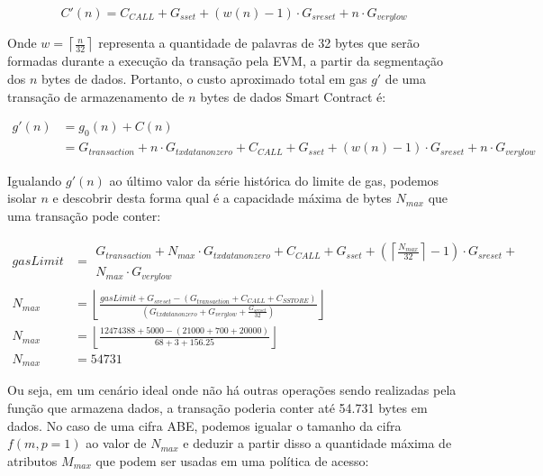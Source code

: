 \documentclass[a4paper,11pt]{article}
\begin{document}
\[ C'(n) = C_{CALL} + G_{sset} +  ( w(n) - 1 ) \cdot G_{sreset} + n \cdot G_{verylow} \]

Onde $w = \left\lceil \frac{n}{32} \right\rceil $ representa a quantidade de palavras de 32 bytes que serão formadas durante a execução da transação pela EVM, a partir da segmentação dos $n$ bytes de dados.
Portanto, o custo aproximado total em gas $g'$ de uma transação de armazenamento de $n$ bytes de dados Smart Contract é:

\begin{equation}
  \begin{aligned}
    g'(n) & = g_{0}(n) + C(n)\\
      & = G_{transaction} + n \cdot G_{txdatanonzero} + C_{CALL} + G_{sset} +  ( w(n) - 1 ) \cdot G_{sreset} + n \cdot G_{verylow}
  \end{aligned}
\end{equation}

Igualando $g'(n)$ ao último valor da série histórica do limite de gas, podemos isolar $n$ e descobrir desta forma qual é a capacidade máxima de bytes $N_{max}$ que uma transação pode conter:

\begin{equation}
  \begin{aligned}
    gasLimit & =\begin{aligned}
                    G_{transaction} + N_{max} \cdot G_{txdatanonzero} + C_{CALL} + G_{sset} + ( \left\lceil \frac{N_{max}}{32} \right\rceil - 1 ) \cdot G_{sreset} + \\ N_{max} \cdot G_{verylow}
                \end{aligned} \\
     N_{max} & = \left\lfloor \frac{gasLimit + G_{sreset} - (G_{transaction} + C_{CALL} + C_{SSTORE})}{(G_{txdatanonzero} + G_{verylow} + \frac{G_{sreset}}{32})} \right\rfloor \\
     N_{max} & = \left\lfloor \frac{12474388 + 5000 - (21000 + 700 + 20000)}{68 + 3 + 156.25} \right\rfloor \\
     N_{max} & = 54731
  \end{aligned}
\end{equation}

Ou seja, em um cenário ideal onde não há outras operações sendo realizadas pela função que armazena dados, a transação poderia conter até 54.731 bytes em dados.
No caso de uma cifra ABE, podemos igualar o tamanho da cifra $f(m, p = 1)$ ao valor de $N_{max}$ e deduzir a partir disso a quantidade máxima de atributos $M_{max}$ que podem ser usadas em uma política de acesso:
\end{document}
